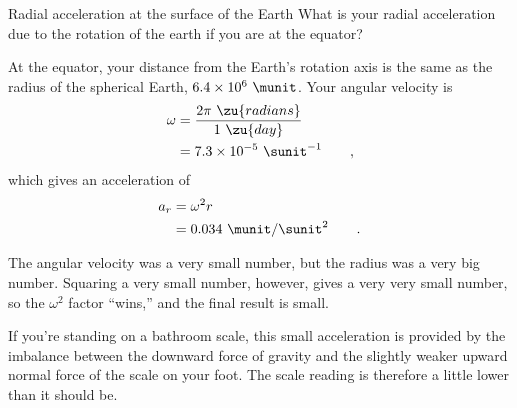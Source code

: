 \begin{eg}{Radial acceleration at the surface of the Earth}
\egquestion
What is your radial acceleration due to the
rotation of the earth if you are at the equator?

\eganswer
At the equator, your distance from the Earth's
rotation axis is the same as the radius of the spherical
Earth, $ 6.4\times10^6\ \munit$. Your angular velocity
is
\begin{align*}
                \omega &= \frac{2\pi\ \zu{radians}}{1\ \zu{day}} \\
                        &=  7.3\times10^{-5}\ \sunit^{-1} \qquad   ,
\end{align*}
which gives an acceleration of
\begin{align*}
        a_{r}        &=  \omega^2 r \\
        &=   0.034\ \munit/\sunit^2 \qquad .
\end{align*}

The angular velocity was a very small number, but the radius
was a very big number. Squaring a very small number,
however, gives a very very small number, so the $\omega^2$ factor
``wins,'' and the final result is small.

If you're
standing on a bathroom scale, this small acceleration is
provided by the imbalance between the downward force of
gravity and the slightly weaker upward normal force of the
scale on your foot. The scale reading is therefore a little
lower than it should be.
\end{eg}


